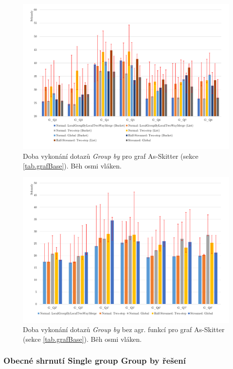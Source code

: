 \begin{figure}[!htp]
\includegraphics[width=\linewidth]{../img/skitterGroupByPar.pdf}\centering
\caption{Doba vykonání dotazů \textit{Group by} pro graf As-Skitter (sekce \ref{tab.grafBase}). Běh osmi vláken.}
\label{figure.skitterGroupByPar}
\end{figure}
\begin{figure}[!htp]
\includegraphics[width=\linewidth]{../img/skitterGroupByParNoAgg.pdf}\centering
\caption{Doba vykonání dotazů \textit{Group by} bez agr. funkcí pro graf As-Skitter (sekce \ref{tab.grafBase}). Běh osmi vláken.}
\label{figure.skitterGroupByParNoAgg}
\end{figure}
\bigskip

\subsubsection{Obecné shrnutí Single group Group by řešení} \label{expr.results.groupby.sinleGroup}

